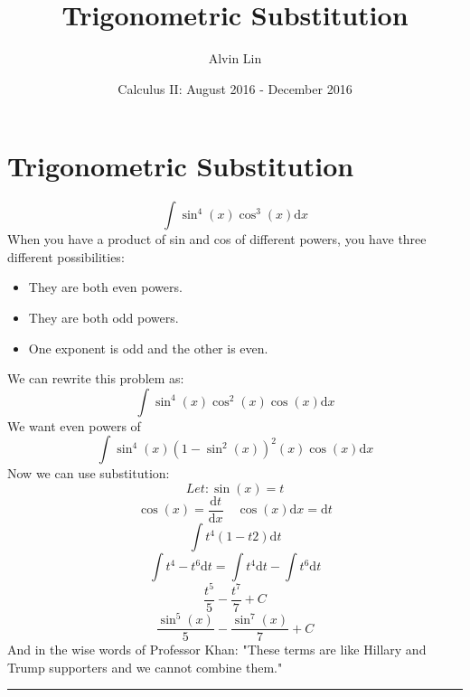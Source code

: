 \documentclass[letterpaper, 12pt]{article}
\title{Trigonometric Substitution}
\author{Alvin Lin}
\date{Calculus II: August 2016 - December 2016}
\newcommand*{\diff}{\mathrm{d}}
\begin{document}
\maketitle

\section*{Trigonometric Substitution}
\[ \int{\sin^{4}(x)\cos^{3}(x)\diff{x}} \]
When you have a product of sin and cos of different powers,
you have three different possibilities:
\begin{itemize}
  \item They are both even powers.
  \item They are both odd powers.
  \item One exponent is odd and the other is even.
\end{itemize}
We can rewrite this problem as:
\[ \int{\sin^{4}(x)\cos^{2}(x)\cos(x)\diff{x}} \]
We want even powers of
\[ \int{\sin^{4}(x)(1-\sin^{2}(x))^{2}(x)\cos(x)\diff{x}} \]
Now we can use substitution:
\[ Let: \sin(x) = t \]
\[ \cos(x) = \frac{\diff{t}}{\diff{x}} \quad \cos(x)\diff{x} = \diff{t} \]
\[ \int{t^{4}(1-t{2})\diff{t}} \]
\[ \int{t^{4}-t^{6}\diff{t}} = \int{t^{4}\diff{t}}-\int{t^{6}\diff{t}} \]
\[ \frac{t^{5}}{5}-\frac{t^{7}}{7}+C \]
\[ \frac{\sin^{5}(x)}{5}-\frac{\sin^{7}(x)}{7}+C \]
And in the wise words of Professor Khan: "These terms are like Hillary and
Trump supporters and we cannot combine them."

\noindent\rule{13.7cm}{0.4pt}
\end{document}
